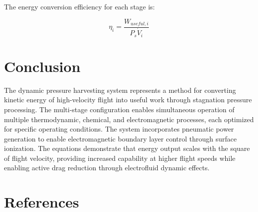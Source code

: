\documentclass[12pt,a4paper]{article}
\begin{document}
The energy conversion efficiency for each stage is:

\begin{equation}
\eta_i = \frac{W_{useful,i}}{P_s \dot{V}_i}
\end{equation}

\section{Conclusion}

The dynamic pressure harvesting system represents a method for converting kinetic energy of high-velocity flight into useful work through stagnation pressure processing. The multi-stage configuration enables simultaneous operation of multiple thermodynamic, chemical, and electromagnetic processes, each optimized for specific operating conditions. The system incorporates pneumatic power generation to enable electromagnetic boundary layer control through surface ionization. The equations demonstrate that energy output scales with the square of flight velocity, providing increased capability at higher flight speeds while enabling active drag reduction through electrofluid dynamic effects.

\section{References}
\end{document}

